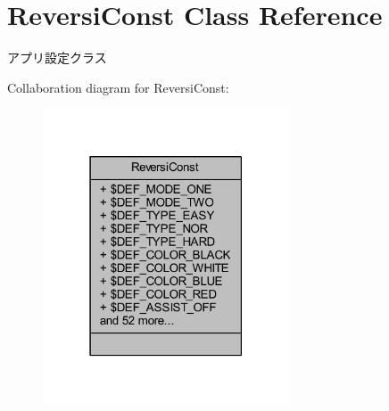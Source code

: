 \hypertarget{class_reversi_const}{}\section{Reversi\+Const Class Reference}
\label{class_reversi_const}


アプリ設定クラス  




Collaboration diagram for Reversi\+Const\+:\nopagebreak
\begin{figure}[H]
\begin{center}
\leavevmode
\includegraphics[width=207pt]{class_reversi_const__coll__graph}
\end{center}
\end{figure}
